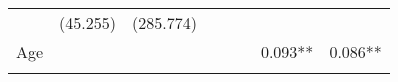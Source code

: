 \documentclass[12pt,twoside]{reedthesis}
\begin{document}
\begin{longtable}[]{@{}lccccccc@{}}
\begin{minipage}[t]{0.10\columnwidth}
  \strut
  \end{minipage} & \begin{minipage}[t]{0.10\columnwidth}\centering\strut
  (45.255)\strut
  \end{minipage} & \begin{minipage}[t]{0.10\columnwidth}\centering\strut
  (285.774)\strut
  \end{minipage}\tabularnewline
  \begin{minipage}[t]{0.12\columnwidth}\raggedright\strut
  Age\strut
  \end{minipage} & \begin{minipage}[t]{0.09\columnwidth}\centering\strut
  \strut
  \end{minipage} & \begin{minipage}[t]{0.10\columnwidth}\centering\strut
  \strut
  \end{minipage} & \begin{minipage}[t]{0.10\columnwidth}\centering\strut
  \strut
  \end{minipage} & \begin{minipage}[t]{0.10\columnwidth}\centering\strut
  \strut
  \end{minipage} & \begin{minipage}[t]{0.10\columnwidth}\centering\strut
  \strut
  \end{minipage} & \begin{minipage}[t]{0.10\columnwidth}\centering\strut
  0.093**\strut
  \end{minipage} & \begin{minipage}[t]{0.10\columnwidth}\centering\strut
  0.086**\strut
  \end{minipage}\tabularnewline
  \begin{minipage}[t]{0.12\columnwidth}\raggedright\strut
  \strut
  \end{minipage} & \begin{minipage}[t]{0.09\columnwidth}\centering\strut
  \strut
  \end{minipage} & \begin{minipage}[t]{0.10\columnwidth}\centering\strut
  \strut
  \end{minipage} & \begin{minipage}[t]{0.10\columnwidth}\centering\strut
  \strut
  \end{minipage} & \begin{minipage}[t]{0.10\columnwidth}\centering\strut
  \strut
  \end{minipage} & \begin{minipage}[t]{0.10\columnwidth}\centering\strut

\end{minipage}
\end{longtable}
\end{document}
